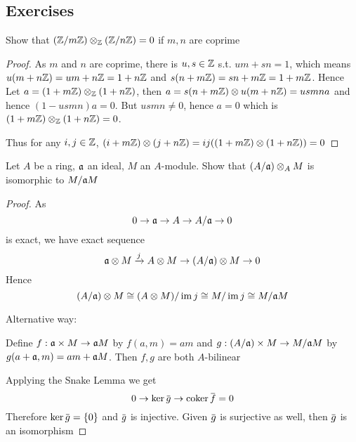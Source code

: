 \documentclass[11pt]{article}
\begin{document}
\subsection{Exercises}
\label{sec:org1b54559}
\begin{exercise}
\label{ex2.1}
Show that \((\mathbb{Z}/m\mathbb{Z})\otimes_{\mathbb{Z}}(\mathbb{Z}/n\mathbb{Z})=0\) if \(m,n\) are coprime
\end{exercise}

\begin{proof}
As \(m\) and \(n\) are coprime, there is \(u,s\in\mathbb{Z}\) s.t. \(um+sn=1\), which
means \(u(m+n\mathbb{Z})=um+n\mathbb{Z}=1+n\mathbb{Z}\) and \(s(n+m\mathbb{Z})=sn+m\mathbb{Z}=1+m\mathbb{Z}\). Hence
Let \(a=(1+m\mathbb{Z})\otimes_{\mathbb{Z}}(1+n\mathbb{Z})\), then
\(a=s(n+m\mathbb{Z})\otimes u(m+n\mathbb{Z})=usmna\) and hence \((1-usmn)a=0\). But \(usmn\neq 0\), hence \(a=0\) which is
\((1+m\mathbb{Z})\otimes_{\mathbb{Z}}(1+n\mathbb{Z})=0\).

Thus for any \(i,j\in\mathbb{Z}\), \((i+m\mathbb{Z})\otimes(j+n\mathbb{Z})=ij((1+m\mathbb{Z})\otimes(1+n\mathbb{Z}))=0\)
\end{proof}

\begin{exercise}
\label{ex2.2}
Let \(A\) be a ring, \(\mathfrak{a}\) an ideal, \(M\) an \(A\)-module. Show that \((A/\mathfrak{a})\otimes_AM\) is
isomorphic to \(M/\mathfrak{a} M\)
\end{exercise}

\begin{proof}
As
\begin{equation*}
0\to\mathfrak{a}\to A\to A/\mathfrak{a}\to 0
\end{equation*}
is exact, we have exact sequence
\begin{equation*}
\mathfrak{a}\otimes M\xrightarrow{j}A\otimes M\to(A/\mathfrak{a})\otimes M\to 0
\end{equation*}
Hence
\begin{equation*}
(A/\mathfrak{a})\otimes M\cong(A\otimes M)/\operatorname{im} j\cong M/\operatorname{im} j\cong M/\mathfrak{a} M
\end{equation*}

Alternative way:

Define \(f:\mathfrak{a}\times M\to\mathfrak{a} M\) by \(f(a,m)=am\) and \(g:(A/\mathfrak{a})\times M\to M/\mathfrak{a} M\) by \(g(a+\mathfrak{a},m)=am+\mathfrak{a} M\).
Then \(f,g\) are both \(A\)-bilinear
\begin{center}\end{center}
Applying the Snake Lemma we get
\begin{equation*}
0\to\ker\barg\to\coker\barf=0
\end{equation*}
Therefore \(\ker\barg=\{0\}\) and \(\barg\) is injective. Given \(\barg\) is surjective as well,
then \(\barg\) is an isomorphism
\end{proof}
\end{document}
